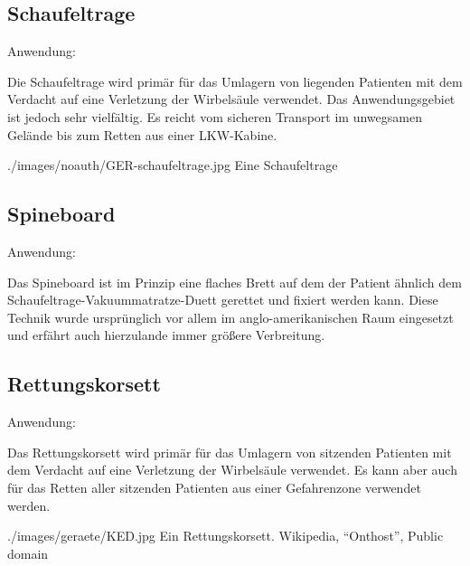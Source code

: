 \subsection{Schaufeltrage}
\label{topic:schaufeltrage-beschreibung}

{
Anwendung: 

Die Schaufeltrage wird primär für das Umlagern von liegenden
Patienten mit dem Verdacht auf eine Verletzung der
Wirbelsäule verwendet. Das Anwendungsgebiet ist jedoch sehr
vielfältig. Es reicht vom sicheren Transport im unwegsamen
Gelände bis zum Retten aus einer LKW-Kabine.

{\TakeNotesLarge}
}{

}
{./images/noauth/GER-schaufeltrage.jpg}
{Eine Schaufeltrage}
{}

\subsection{Spineboard}
\label{topic:spineboard-beschreibung}

Anwendung: 

Das Spineboard ist im Prinzip eine flaches Brett auf dem
der Patient ähnlich dem Schaufeltrage-Vakuummatratze-Duett
gerettet und fixiert werden kann. Diese Technik wurde
ursprünglich vor allem im anglo-amerikanischen Raum
eingesetzt und erfährt auch hierzulande immer größere
Verbreitung.



\subsection{Rettungskorsett}
\label{topic:rettungskorsett-beschreibung}

Anwendung: 

{
Das Rettungskorsett wird primär für das Umlagern von
sitzenden Patienten mit dem Verdacht auf eine Verletzung der
Wirbelsäule verwendet. Es kann aber auch für das Retten
aller sitzenden Patienten aus einer Gefahrenzone verwendet
werden.

{\TakeNotesLarge}
}{

}
{./images/geraete/KED.jpg}
{Ein Rettungskorsett.}
{Wikipedia, "`Onthost"', Public domain}




